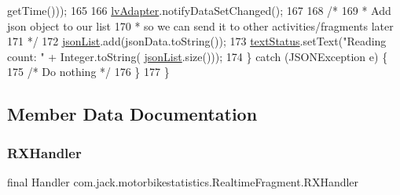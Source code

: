 \begin{DoxyCode}
      getTime()));
165 
166             \hyperlink{classcom_1_1jack_1_1motorbikestatistics_1_1_realtime_fragment_ae5e621d6d5f22ddb72ace3ca227f3760}{lvAdapter}.notifyDataSetChanged();
167 
168             \textcolor{comment}{/*}
169 \textcolor{comment}{             * Add json object to our list}
170 \textcolor{comment}{             * so we can send it to other activities/fragments later}
171 \textcolor{comment}{             */}
172             \hyperlink{classcom_1_1jack_1_1motorbikestatistics_1_1_realtime_fragment_aeaf4c36f29c56ec961bda017de9cc671}{jsonList}.add(jsonData.toString());
173             \hyperlink{classcom_1_1jack_1_1motorbikestatistics_1_1_realtime_fragment_a934eb88d5412c4a06635e8b2dcdde397}{textStatus}.setText(\textcolor{stringliteral}{"Reading count: "} + Integer.toString(
      \hyperlink{classcom_1_1jack_1_1motorbikestatistics_1_1_realtime_fragment_aeaf4c36f29c56ec961bda017de9cc671}{jsonList}.size()));
174         \} \textcolor{keywordflow}{catch} (JSONException e) \{
175             \textcolor{comment}{/* Do nothing */}
176         \}
177     \}
\end{DoxyCode}


\subsection{Member Data Documentation}
\mbox{\label{classcom_1_1jack_1_1motorbikestatistics_1_1_realtime_fragment_a7b39a40287200b7530c2d935e6717fa6}} 
\subsubsection{\texorpdfstring{R\+X\+Handler}{RXHandler}}
{\footnotesize\ttfamily final Handler com.\+jack.\+motorbikestatistics.\+Realtime\+Fragment.\+R\+X\+Handler}

